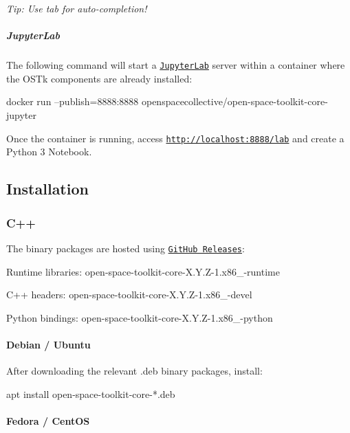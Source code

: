 {\itshape Tip\+: Use tab for auto-\/completion!}

\subparagraph*{Jupyter\+Lab}

The following command will start a \href{https://jupyterlab.readthedocs.io/en/stable/}{\tt Jupyter\+Lab} server within a container where the O\+S\+Tk components are already installed\+:


\begin{DoxyCode}
docker run --publish=8888:8888 openspacecollective/open-space-toolkit-core-jupyter
\end{DoxyCode}


Once the container is running, access \href{http://localhost:8888/lab}{\tt http\+://localhost\+:8888/lab} and create a Python 3 Notebook.

\subsection*{Installation}

\subsubsection*{C++}

The binary packages are hosted using \href{https://github.com/open-space-collective/open-space-toolkit-core/releases}{\tt Git\+Hub Releases}\+:


\begin{DoxyItemize}
\item Runtime libraries\+: {\ttfamily open-\/space-\/toolkit-\/core-\/\+X.\+Y.\+Z-\/1.\+x86\+\_-\/runtime}
\item C++ headers\+: {\ttfamily open-\/space-\/toolkit-\/core-\/\+X.\+Y.\+Z-\/1.\+x86\+\_-\/devel}
\item Python bindings\+: {\ttfamily open-\/space-\/toolkit-\/core-\/\+X.\+Y.\+Z-\/1.\+x86\+\_-\/python}
\end{DoxyItemize}

\paragraph*{Debian / Ubuntu}

After downloading the relevant {\ttfamily .deb} binary packages, install\+:


\begin{DoxyCode}
apt install open-space-toolkit-core-*.deb
\end{DoxyCode}


\paragraph*{Fedora / Cent\+OS}

